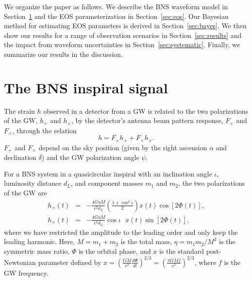 \documentclass[twocolumn,prd,amssymb,aps,nofootinbib,showpacs,epsf]{revtex4}
\begin{document}
We organize the paper as follows. We describe the BNS waveform model in Section~\ref{sec:waveform} and the EOS parameterization in Section~\ref{sec:eos}. Our Bayesian method for estimating EOS parameters is derived in Section~\ref{sec:bayes}. We then show our results for a range of observation scenarios in Section~\ref{sec:results} and the impact from waveform uncertainties in Section~\ref{sec:systematic}. Finally, we summarize our results in the discussion.


\section{The BNS inspiral signal}
\label{sec:waveform}

The strain $h$ observed in a detector from a GW is related to the two polarizations of the GW, $h_+$ and $h_\times$, by the detector's antenna beam pattern response, $F_+$ and $F_\times$, through the relation
\begin{equation}
h = F_+ h_+ + F_\times h_\times.
\end{equation}
$F_+$ and $F_\times$ depend on the sky position (given by the right ascension $\alpha$ and declination $\delta$) and the GW polarization angle $\psi$.

For a BNS system in a quasicircular inspiral with an inclination angle $\iota$, luminosity distance $d_L$, and component masses $m_1$ and $m_2$, the two polarizations of the GW are
\begin{eqnarray}
\label{eq:hoftp}
h_+(t)&=&-\frac{4G\eta M}{c^2 d_L}\left(\frac{1+\cos^2\iota}{2}\right)x(t)\cos\left[2\Phi(t)\right],\\
\label{eq:hoftc}
h_\times(t)&=&-\frac{4G\eta M}{c^2 d_L}\cos\iota\mbox{ }x(t)\sin\left[2\Phi(t)\right],
\end{eqnarray}
where we have restricted the amplitude to the leading order and only keep the leading harmonic. Here, $M=m_1+m_2$ is the total mass, $\eta=m_1 m_2/M^2$ is the symmetric mass ratio, $\Phi$ is the orbital phase, and $x$ is the standard post-Newtonian parameter defined by $x = \left( \frac{GM}{c^3}\frac{d\Phi}{dt} \right)^{2/3} = \left( \frac{\pi GM f}{c^3} \right)^{2/3}$, where $f$ is the GW frequency.
\end{document}
